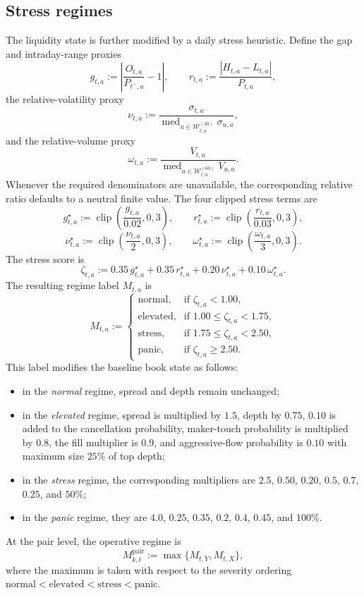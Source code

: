 \documentclass[11pt,a4paper]{article}
\begin{document}
\subsection{Stress regimes}

The liquidity state is further modified by a daily stress heuristic. Define the
gap and intraday-range proxies
\[
  g_{t,a}
  :=
  \left|
    \frac{O_{t,a}}{P_{t^{-},a}} - 1
  \right|,
  \qquad
  r_{t,a}
  :=
  \frac{|H_{t,a}-L_{t,a}|}{P_{t,a}},
\]
the relative-volatility proxy
\[
  \nu_{t,a}
  :=
  \frac{\sigma_{t,a}}
       {\operatorname{med}_{u\in\mathcal W_{t,a}^{(30)}}\sigma_{u,a}},
\]
and the relative-volume proxy
\[
  \omega_{t,a}
  :=
  \frac{V_{t,a}}
       {\operatorname{med}_{u\in\mathcal W_{t,a}^{(60)}}V_{u,a}}.
\]
Whenever the required denominators are unavailable, the corresponding relative
ratio defaults to a neutral finite value. The four clipped stress terms are
\[
  g^\star_{t,a}
  :=
  \operatorname{clip}\!\left(\frac{g_{t,a}}{0.02},0,3\right),
  \qquad
  r^\star_{t,a}
  :=
  \operatorname{clip}\!\left(\frac{r_{t,a}}{0.03},0,3\right),
\]
\[
  \nu^\star_{t,a}
  :=
  \operatorname{clip}\!\left(\frac{\nu_{t,a}}{2},0,3\right),
  \qquad
  \omega^\star_{t,a}
  :=
  \operatorname{clip}\!\left(\frac{\omega_{t,a}}{3},0,3\right).
\]
The stress score is
\[
  \zeta_{t,a}
  :=
  0.35\,g^\star_{t,a}
  +
  0.35\,r^\star_{t,a}
  +
  0.20\,\nu^\star_{t,a}
  +
  0.10\,\omega^\star_{t,a}.
\]
The resulting regime label \(M_{t,a}\) is
\[
  M_{t,a}
  :=
  \begin{cases}
    \text{normal}, & \text{if } \zeta_{t,a}<1.00,\\
    \text{elevated}, & \text{if } 1.00 \le \zeta_{t,a}<1.75,\\
    \text{stress}, & \text{if } 1.75 \le \zeta_{t,a}<2.50,\\
    \text{panic}, & \text{if } \zeta_{t,a}\ge 2.50.
  \end{cases}
\]
This label modifies the baseline book state as follows:
\begin{itemize}[itemsep=2pt,topsep=4pt]
  \item in the \emph{normal} regime, spread and depth remain unchanged;
  \item in the \emph{elevated} regime, spread is multiplied by \(1.5\), depth by
        \(0.75\), \(0.10\) is added to the cancellation probability, maker-touch
        probability is multiplied by \(0.8\), the fill multiplier is \(0.9\),
        and aggressive-flow probability is \(0.10\) with maximum size
        \(25\%\) of top depth;
  \item in the \emph{stress} regime, the corresponding multipliers are \(2.5\),
        \(0.50\), \(0.20\), \(0.5\), \(0.7\), \(0.25\), and \(50\%\);
  \item in the \emph{panic} regime, they are \(4.0\), \(0.25\), \(0.35\),
        \(0.2\), \(0.4\), \(0.45\), and \(100\%\).
\end{itemize}
At the pair level, the operative regime is
\[
  M_{k,t}^{\mathrm{pair}}
  :=
  \max\{M_{t,Y},M_{t,X}\},
\]
where the maximum is taken with respect to the severity ordering
\(\text{normal}<\text{elevated}<\text{stress}<\text{panic}\).
\end{document}
